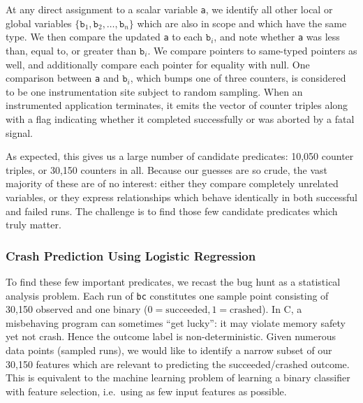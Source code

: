 At any direct assignment to a scalar variable \texttt{a}, we identify
all other local or global variables $\{ \mathtt{b}_1, \mathtt{b}_2,
\dots, \mathtt{b}_n \}$ which are also in scope and which have the
same type.  We then compare the updated \texttt{a} to each
$\mathtt{b}_i$, and note whether \texttt{a} was less than, equal to,
or greater than $\mathtt{b}_i$.
We compare pointers to same-typed pointers as well, and additionally
compare each pointer for equality with null.  One comparison between
\texttt{a} and $\mathtt{b}_i$, which bumps one of three counters, is
considered to be one instrumentation site subject to random sampling.
When an instrumented application terminates, it emits the vector of
counter triples along with a flag indicating whether it completed
successfully or was aborted by a fatal signal.

As expected, this gives us a large number of candidate predicates:
10,050 counter triples, or 30,150 counters in all.  Because our
guesses are so crude, the vast majority of these are of no interest:
either they compare completely unrelated variables, or they express
relationships which behave identically in both successful and failed
runs.  The challenge is to find those few candidate predicates which
truly matter.

\subsubsection{Crash Prediction Using Logistic Regression}

To find these few important predicates, we recast the bug hunt as a
statistical analysis problem.  Each run of \texttt{bc} constitutes one
sample point consisting of 30,150 observed  and one
binary  ($0 = \text{succeeded}, 1 = \text{crashed}$).
In C, a misbehaving program can sometimes ``get lucky'': it may
violate memory safety yet not crash.  Hence the outcome label is
non-deterministic.  Given numerous data points (sampled runs), we
would like to identify a narrow subset of our 30,150 features which
are relevant to predicting the succeeded/crashed outcome.  This is
equivalent to the machine learning problem of learning a binary
classifier with feature selection, i.e.\ using as few input features
as possible.

